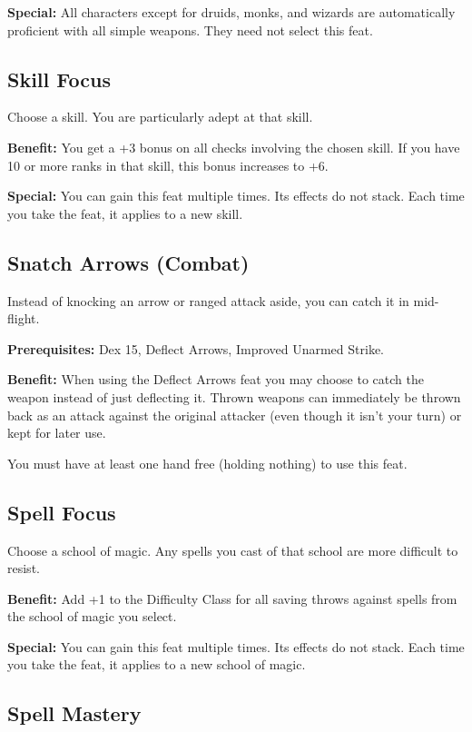 \textbf{Special:} All characters except for druids, monks, and wizards are automatically proficient with all simple weapons. They need not select this feat.
				
\subsection{Skill Focus}

				
Choose a skill. You are particularly adept at that skill.
				
\textbf{Benefit:} You get a +3 bonus on all checks involving the chosen skill. If you have 10 or more ranks in that skill, this bonus increases to +6.
				
\textbf{Special:} You can gain this feat multiple times. Its effects do not stack. Each time you take the feat, it applies to a new skill.
				
\subsection{Snatch Arrows (Combat)}

				
Instead of knocking an arrow or ranged attack aside, you can catch it in mid-flight.
				
\textbf{Prerequisites:} Dex 15, Deflect Arrows, Improved Unarmed Strike.
				
\textbf{Benefit:} When using the Deflect Arrows feat you may choose to catch the weapon instead of just deflecting it. Thrown weapons can immediately be thrown back as an attack against the original attacker (even though it isn't your turn) or kept for later use.

You must have at least one hand free (holding nothing) to use this feat.
				
\subsection{Spell Focus}

				
Choose a school of magic. Any spells you cast of that school are more difficult to resist.
				
\textbf{Benefit:} Add +1 to the Difficulty Class for all saving throws against spells from the school of magic you select.
				
\textbf{Special:} You can gain this feat multiple times. Its effects do not stack. Each time you take the feat, it applies to a new school of magic.
				
\subsection{Spell Mastery}

